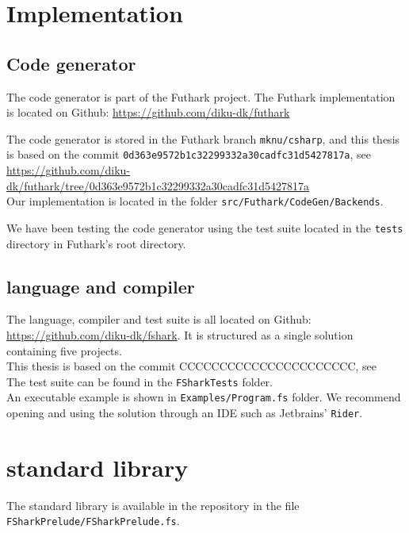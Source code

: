 \begin{appendices}
\chapter{Implementation}
\section{Code generator}
The \csharp{} code generator is part of the Futhark project.
The Futhark implementation is located on Github:
\url{https://github.com/diku-dk/futhark}

The code generator is stored in the Futhark branch \texttt{mknu/csharp}, and
this thesis is based
on the commit \texttt{0d363e9572b1c32299332a30cadfc31d5427817a}, see\\
{\scriptsize \url{https://github.com/diku-dk/futhark/tree/0d363e9572b1c32299332a30cadfc31d5427817a}}\\
Our implementation is located in the folder
\texttt{src/Futhark/CodeGen/Backends}.

We have been testing the code generator using the test suite located in the 
\texttt{tests} directory in Futhark's root directory.

\section{\fshark{} language and compiler}
The \fshark{} language, compiler and test suite is all located on Github:\\
\url{https://github.com/diku-dk/fshark}. It is structured as a single \fsharp{}
solution containing five \fsharp{} projects.\\
This thesis is based on the commit CCCCCCCCCCCCCCCCCCCCCC, see\\

The \fshark{} test suite can be found in the \texttt{FSharkTests} folder.\\
An executable example is shown in \texttt{Examples/Program.fs} folder.
We recommend opening and using the \fshark{} solution through an IDE such as
Jetbrains' \texttt{Rider}.

\chapter{\fshark{} standard library}
\label{appendix:soacs}
The \fshark{} standard library is available in the \fshark{} repository in the file \texttt{FSharkPrelude/FSharkPrelude.fs}.


\end{appendices}

